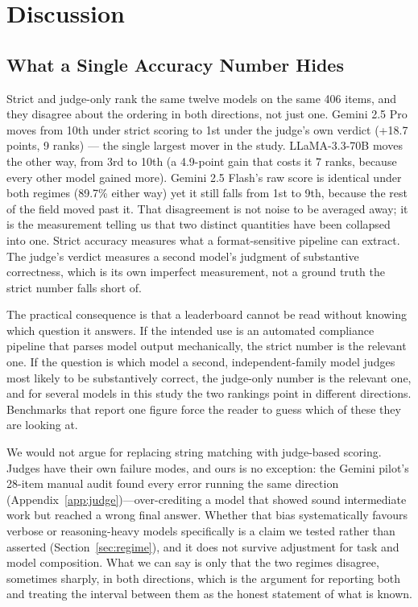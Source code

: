 
\section{Discussion}
\label{sec:discussion}

\subsection{What a Single Accuracy Number Hides}

Strict and judge-only rank the same twelve models on the same 406 items, and they disagree about the
ordering in both directions, not just one. Gemini 2.5 Pro moves from 10th under strict scoring to
1st under the judge's own verdict (+18.7 points, 9 ranks) --- the single largest mover in the study.
LLaMA-3.3-70B moves the other way, from 3rd to 10th (a 4.9-point gain that costs it 7 ranks, because
every other model gained more). Gemini 2.5 Flash's raw score is identical under both regimes (89.7\%
either way) yet it still falls from 1st to 9th, because the rest of the field moved past it. That
disagreement is not noise to be averaged
away; it is the measurement telling us that two distinct quantities have been collapsed into one.
Strict accuracy measures what a format-sensitive pipeline can extract. The judge's verdict measures
a second model's judgment of substantive correctness, which is its own imperfect measurement, not a
ground truth the strict number falls short of.

The practical consequence is that a leaderboard cannot be read without knowing which question it
answers. If the intended use is an automated compliance pipeline that parses model output
mechanically, the strict number is the relevant one. If the question is which model a second,
independent-family model judges most likely to be substantively correct, the judge-only number is
the relevant one, and for several models in this study the two rankings point in different
directions. Benchmarks that report one figure force the reader to guess which of these they are
looking at.

We would not argue for replacing string matching with judge-based scoring. Judges have their own
failure modes, and ours is no exception: the Gemini pilot's 28-item manual audit found every error
running the same direction (Appendix~\ref{app:judge})---over-crediting a model that showed sound
intermediate work but reached a wrong final answer. Whether that bias systematically favours verbose
or reasoning-heavy models specifically is a claim we tested rather than asserted (Section~\ref{sec:regime}),
and it does not survive adjustment for task and model composition. What we can say is only that the
two regimes disagree, sometimes sharply, in both directions, which is the argument for reporting
both and treating the interval between them as the honest statement of what is known.

